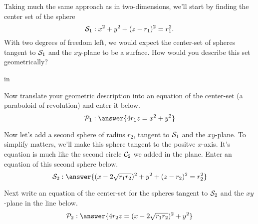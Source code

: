 \documentclass{ximera}
\newcommand{\pskip}{\vskip 0.1 in}
\begin{document}
\begin{question}    \label{Q23423:Spheres}
  
Taking much the same approach as in two-dimensions, we'll start by finding the center set of the sphere %
\[
      {\cal S}_1:    x^2 + y^2 + (z-r_1)^2 = r_1^2 .
\]
With two degrees of freedom left, we would expect the center-set of spheres tangent to ${\cal S}_1$ and the $xy$-plane to be a surface. How would you describe this set geometrically?
 
  \begin{selectAll}  
  \end{selectAll}  

\pskip

Now translate your geometric description into an equation of the center-set (a paraboloid of revolution) and enter it below.
\[
   {\cal P}_1:  \answer{4 r_1z  = x^2 + y^2}
\]
\end{question}





 
\begin{onlineOnly}
    \begin{center}
\end{center}
\end{onlineOnly}

\begin{question}  \label{Q365434:Spheres}
Now let's add a second sphere of radius $r_2$, tangent to ${\cal S}_1$ and the $xy$-plane. To simplify matters, we'll make this sphere tangent to the positve $x$-axis. It's equation is much like the second circle ${\cal C}_2$ we added in the plane. Enter an equation of this second sphere below.
\[
   {\cal S}_2: \answer{(x-2\sqrt{r_1r_2})^2 + y^2 + (z-r_2)^2 = r_2^2}
\]

Next write an equation of the center-set for the spheres tangent to ${\cal S}_2$ and the $xy$-plane in the line below.
\[
   {\cal P}_2:  \answer{4r_2z = (x-2\sqrt{r_1r_2})^2 + y^2}
\]

\end{question}
\end{document}
